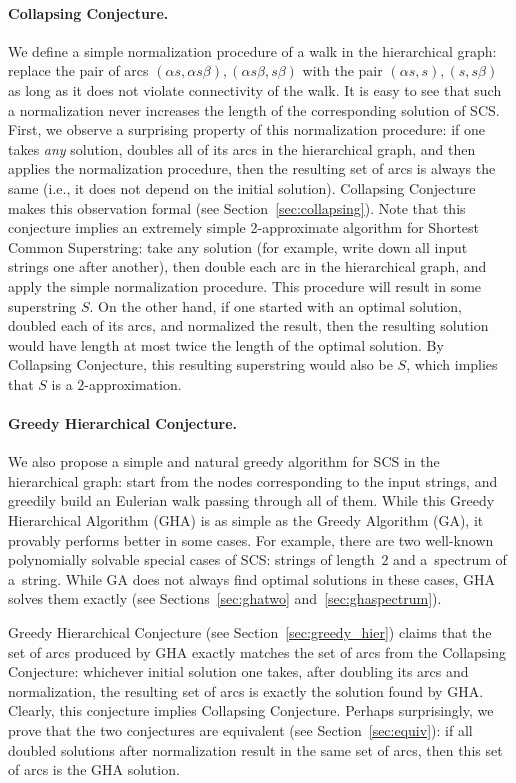 \paragraph{Collapsing Conjecture.}
We define a simple normalization procedure of a walk in the hierarchical graph: replace the pair of arcs $(\alpha s, \alpha s \beta), (\alpha s \beta, s\beta)$ with the pair $(\alpha s, s ), (s , s\beta)$ as long as it does not violate connectivity of the walk. It is easy to see that such a normalization never increases the length of the corresponding solution of SCS. 
First, we observe a surprising property of this normalization procedure: if one takes \emph{any} solution, doubles all of its arcs in the hierarchical graph, and then applies the normalization procedure, then the resulting set of arcs is always the same (i.e., it does not depend on the initial solution). Collapsing Conjecture makes this observation formal (see Section~\ref{sec:collapsing}). Note that this conjecture implies an extremely simple 2-approximate algorithm for Shortest Common Superstring: take any solution (for example, write down all input strings one after another), then double each arc in the hierarchical graph, and apply the simple normalization procedure. This procedure will result in some superstring $S$. On the other hand, if one started with an optimal solution, doubled each of its arcs, and normalized the result, then the resulting solution would have length at most twice the length of the optimal solution. By Collapsing Conjecture, this resulting superstring would also be $S$, which implies that $S$ is a $2$-approximation.

\paragraph{Greedy Hierarchical Conjecture.}
We also propose a simple and natural greedy algorithm for SCS in the hierarchical graph: start from the nodes corresponding to the input strings, and greedily build an Eulerian walk passing through all of them. 
While this Greedy Hierarchical Algorithm (GHA) is as simple as the Greedy Algorithm (GA), it provably performs better in some cases. For example, there are two well-known polynomially solvable special cases of SCS: strings of length~$2$ and
a~spectrum of a~string. While GA does not always find optimal solutions in these cases, GHA solves them exactly (see Sections~\ref{sec:ghatwo} and~\ref{sec:ghaspectrum}).

Greedy Hierarchical Conjecture (see Section~\ref{sec:greedy_hier}) claims that the set of arcs produced by GHA exactly matches the set of arcs from the Collapsing Conjecture: whichever initial solution one takes, after doubling its arcs and normalization, the resulting set of arcs is exactly the solution found by GHA. Clearly, this conjecture implies Collapsing Conjecture. Perhaps surprisingly, we prove that the two conjectures are equivalent (see Section~\ref{sec:equiv}): if all doubled solutions after normalization result in the same set of arcs, then this set of arcs is the GHA solution.

